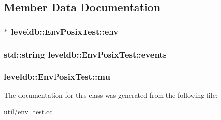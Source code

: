 \subsection{Member Data Documentation}
\hypertarget{classleveldb_1_1_env_posix_test_a6d8ded8756fa7391e086fb31a865e639}{
\subsubsection[{env\-\_\-}]{$\ast$ leveldb\-::\-Env\-Posix\-Test\-::env\-\_\-}}\label{classleveldb_1_1_env_posix_test_a6d8ded8756fa7391e086fb31a865e639}
\hypertarget{classleveldb_1_1_env_posix_test_abb78ea3ef0450a24c05560e1480d0660}{
\subsubsection[{events\-\_\-}]{\setlength{\rightskip}{0pt plus 5cm}std\-::string leveldb\-::\-Env\-Posix\-Test\-::events\-\_\-\hspace{0.3cm}{\ttfamily [private]}}}\label{classleveldb_1_1_env_posix_test_abb78ea3ef0450a24c05560e1480d0660}
\hypertarget{classleveldb_1_1_env_posix_test_ab285153bfecbfb0be8a2fa247e46d6e8}{
\subsubsection[{mu\-\_\-}]{ leveldb\-::\-Env\-Posix\-Test\-::mu\-\_\-\hspace{0.3cm}{\ttfamily [private]}}}\label{classleveldb_1_1_env_posix_test_ab285153bfecbfb0be8a2fa247e46d6e8}


The documentation for this class was generated from the following file\-:\begin{DoxyCompactItemize}
\item 
util/\hyperlink{env__test_8cc}{env\-\_\-test.\-cc}\end{DoxyCompactItemize}
